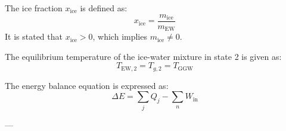 The ice fraction \( x_{\text{ice}} \) is defined as:  
\[
x_{\text{ice}} = \frac{m_{\text{ice}}}{m_{\text{EW}}}
\]  
It is stated that \( x_{\text{ice}} > 0 \), which implies \( m_{\text{ice}} \neq 0 \).  

The equilibrium temperature of the ice-water mixture in state 2 is given as:  
\[
T_{\text{EW},2} = T_{g,2} = T_{\text{GGW}}
\]  

The energy balance equation is expressed as:  
\[
\Delta E = \sum_j Q_j - \sum_n W_{\text{in}}
\]  

---